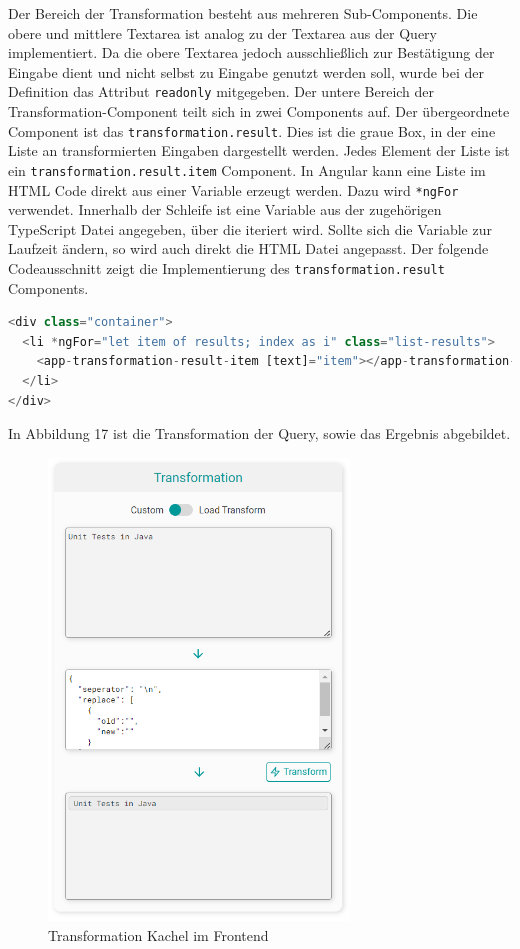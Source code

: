Der Bereich der Transformation besteht aus mehreren Sub-Components. Die obere und mittlere Textarea ist analog zu der Textarea aus der Query implementiert. Da die obere Textarea jedoch ausschließlich zur Bestätigung der Eingabe dient und nicht selbst zu Eingabe genutzt werden soll, wurde bei der Definition das Attribut \texttt{readonly} mitgegeben. Der untere Bereich der Transformation-Component teilt sich in zwei Components auf. Der übergeordnete Component ist das \texttt{transformation.result}. Dies ist die graue Box, in der eine Liste an transformierten Eingaben dargestellt werden. Jedes Element der Liste ist ein \texttt{transformation.result.item} Component. In Angular kann eine Liste im HTML Code direkt aus einer Variable erzeugt werden. Dazu wird \texttt{*ngFor} verwendet. Innerhalb der Schleife ist eine Variable aus der zugehörigen TypeScript Datei angegeben, über die iteriert wird. Sollte sich die Variable zur Laufzeit ändern, so wird auch direkt die HTML Datei angepasst. Der folgende Codeausschnitt zeigt die Implementierung des \texttt{transformation.result} Components.

\begin{lstlisting}[language=Python, caption={Anzeige der Results aus der Transformation}]
<div class="container">
  <li *ngFor="let item of results; index as i" class="list-results">
    <app-transformation-result-item [text]="item"></app-transformation-result-item>
  </li>
</div>
\end{lstlisting}

In Abbildung 17 ist die Transformation der Query, sowie das Ergebnis abgebildet.

\begin{figure}[H]
  \centering
    \includegraphics[width = 8cm]{bilder/websiteTransformation}
    \caption{Transformation Kachel im Frontend}
\end{figure}


